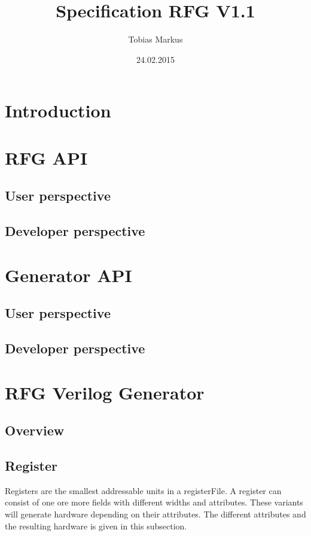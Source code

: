 \documentclass[12pt,a4paper]{article}
\begin{document}
\title{Specification RFG V1.1}
\author{Tobias Markus}
\date{24.02.2015}

\maketitle

\tableofcontents
\newpage
\section{Introduction}
\section{RFG API}
\subsection{User perspective}
\subsection{Developer perspective}
\section{Generator API}
\subsection{User perspective}
\subsection{Developer perspective}
\section{RFG Verilog Generator}

\subsection{Overview}
\newpage
\subsection{Register}
Registers are the smallest addressable units in a registerFile. A register can consist of one ore more fields with different widths and attributes. These variants will generate hardware depending on their attributes. The different attributes and the resulting hardware is given in this subsection. 
\end{document}
